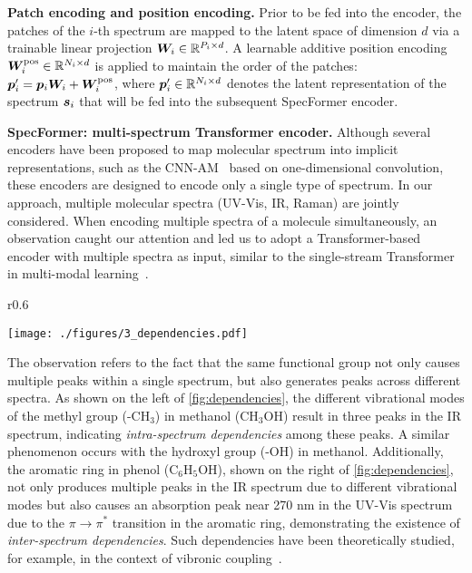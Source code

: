\textbf{Patch encoding and position encoding.}
Prior to be fed into the encoder, the patches of the $i$-th spectrum are mapped to the latent space of dimension $d$ via a trainable linear projection ${\bm{W}}_i \in \mathbb{R}^{P_i \times d}$. A learnable additive position encoding ${\bm{W}}_i^{\text{pos}} \in \mathbb{R}^{N_i \times d}$ is applied to maintain the order of the patches: ${\bm{p}}_i^{\prime} = {\bm{p}}_i {\bm{W}}_i + {\bm{W}}_i^{\text{pos}}$, where ${\bm{p}}_i^{\prime} \in \mathbb{R}^{N_i \times d}$ denotes the latent representation of the spectrum ${\bm{s}}_i$ that will be fed into the subsequent SpecFormer encoder.


\textbf{SpecFormer: multi-spectrum Transformer encoder.}
Although several encoders have been proposed to map molecular spectrum into implicit representations, such as the CNN-AM~\citep{CNN-AM} based on one-dimensional convolution, these encoders are designed to encode only a single type of spectrum. In our approach, multiple molecular spectra (UV-Vis, IR, Raman) are jointly considered. When encoding multiple spectra of a molecule simultaneously, an observation caught our attention and led us to adopt a Transformer-based encoder with multiple spectra as input, similar to the single-stream Transformer in multi-modal learning~\citep{single-stream}. 
\begin{wrapfigure}[15]{r}{0.6\linewidth}
\begin{center}
\vspace{-14pt}
\texttt{[image: ./figures/3\_dependencies.pdf]}
\end{center}
\vspace{-12pt}
\caption{Illustrate of intra-spectrum (left) and inter-spectrum (right) dependencies.}
\label{fig:dependencies}
\end{wrapfigure}
The observation refers to the fact that the same functional group not only causes multiple peaks within a single spectrum, but also generates peaks across different spectra. 
As shown on the left of \cref{fig:dependencies}, the different vibrational modes of the methyl group ($\text{-CH}_3$) in methanol ($\text{CH}_3\text{OH}$) result in three peaks in the IR spectrum, indicating \textit{intra-spectrum dependencies} among these peaks. 
A similar phenomenon occurs with the hydroxyl group ($\text{-OH}$) in methanol. 
Additionally, the aromatic ring in phenol ($\text{C}_6\text{H}_5\text{OH}$), shown on the right of \cref{fig:dependencies}, not only produces multiple peaks in the IR spectrum due to different vibrational modes but also causes an absorption peak near 270 nm in the UV-Vis spectrum due to the $\pi \rightarrow \pi^*$ transition in the aromatic ring, demonstrating the existence of \textit{inter-spectrum dependencies}.
Such dependencies have been theoretically studied, for example, in the context of vibronic coupling~\citep{Vibronic-Coupling}.



